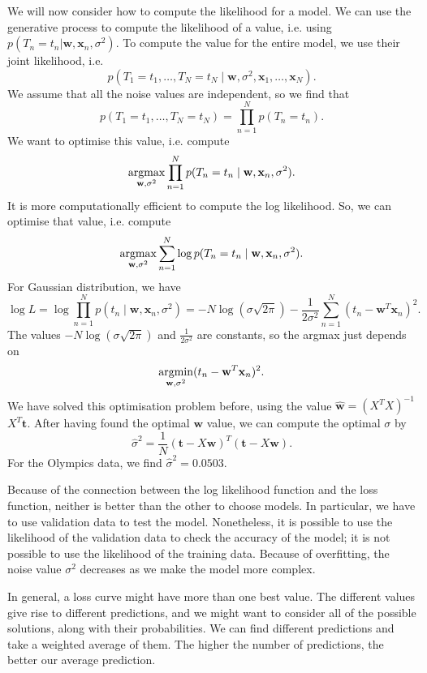 \documentclass[a4paper, openany]{memoir}
\newcommand{\argmin}{\operatornamewithlimits{argmin}}
\newcommand{\argmax}{\operatornamewithlimits{argmax}}
\begin{document}
    We will now consider how to compute the likelihood for a model. We can use the generative process to compute the likelihood of a value, i.e. using $p(T_n = t_n|\mathbf{w}, \mathbf{x}_n, \sigma^2)$. To compute the value for the entire model, we use their joint likelihood, i.e.
    \[p(T_1 = t_1, \dots, T_N = t_N \mid \mathbf{w}, \sigma^2, \mathbf{x}_1, \dots, \mathbf{x}_N).\]
    We assume that all the noise values are independent, so we find that
    \[p(T_1 = t_1, \dots, T_N = t_N) = \prod_{n=1}^N p(T_n = t_n).\]
    We want to optimise this value, i.e. compute 
    \[\argmax_{\mathbf{w}, \sigma^2} \prod_{n=1}^N p(T_n = t_n \mid \mathbf{w}, \mathbf{x}_n, \sigma^2).\]
    It is more computationally efficient to compute the log likelihood. So, we can optimise that value, i.e. compute
    \[\argmax_{\mathbf{w}, \sigma^2} \sum_{n=1}^N \log p(T_n = t_n \mid \mathbf{w}, \mathbf{x}_n, \sigma^2).\]
    For Gaussian distribution, we have
    \[\log L = \log \prod_{n=1}^N p(t_n \mid \mathbf{w}, \mathbf{x}_n, \sigma^2) = -N \log (\sigma \sqrt{2\pi}) - \frac{1}{2\sigma^2} \sum_{n=1}^N (t_n - \mathbf{w}^T \mathbf{x}_n)^2.\]
    The values $-N \log (\sigma \sqrt{2\pi})$ and $\frac{1}{2\sigma^2}$ are constants, so the argmax just depends on
    \[\argmin_{\mathbf{w}, \sigma^2} (t_n - \mathbf{w}^T \mathbf{x}_n)^2.\]
    We have solved this optimisation problem before, using the value $\hat{\mathbf{w}} = (X^T X)^{-1}$ $X^T \mathbf{t}$. After having found the optimal $\mathbf{w}$ value, we can compute the optimal $\sigma$ by 
    \[\hat{\sigma}^2 = \frac{1}{N} (\mathbf{t} - X\mathbf{w})^T (\mathbf{t} - X\mathbf{w}).\]
    For the Olympics data, we find $\hat{\sigma}^2 = 0.0503$. 
    
    Because of the connection between the log likelihood function and the loss function, neither is better than the other to choose models. In particular, we have to use validation data to test the model. Nonetheless, it is possible to use the likelihood of the validation data to check the accuracy of the model; it is not possible to use the likelihood of the training data. Because of overfitting, the noise value $\sigma^2$ decreases as we make the model more complex.

    In general, a loss curve might have more than one best value. The different values give rise to different predictions, and we might want to consider all of the possible solutions, along with their probabilities. We can find different predictions and take a weighted average of them. The higher the number of predictions, the better our average prediction. 
    
\end{document}
